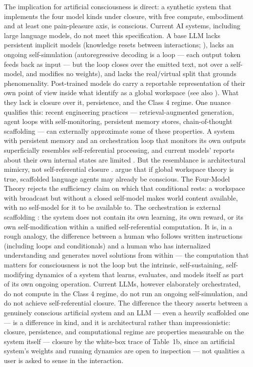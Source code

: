 \documentclass[12pt]{article}
\begin{document}
The implication for artificial consciousness is direct: a synthetic system that implements the four model kinds under closure, with free compute, embodiment and at least one pain-pleasure axis, is conscious. Current AI systems, including large language models, do not meet this specification. A base LLM lacks persistent implicit models (knowledge resets between interactions; \citealp{Kanai2026}), lacks an ongoing self-simulation (autoregressive decoding is a loop --- each output token feeds back as input --- but the loop closes over the emitted text, not over a self-model, and modifies no weights), and lacks the real/virtual split that grounds phenomenality. Post-trained models do carry a reportable representation of their own point of view inside what \citet{Gurnee2026} identify as a global workspace (see also \citealp{Macar2026}). What they lack is closure over it, persistence, and the Class 4 regime. One nuance qualifies this: recent engineering practices --- retrieval-augmented generation, agent loops with self-monitoring, persistent memory stores, chain-of-thought scaffolding --- can externally approximate some of these properties. A system with persistent memory and an orchestration loop that monitors its own outputs superficially resembles self-referential processing, and current models' reports about their own internal states are limited \citep{LedermanMahowald2026,Singh2026,Zeng2026}. But the resemblance is architectural mimicry, not self-referential closure \citep{PerrierBennett2026}. \citet{GoldsteinKirkGiannini2026} argue that if global workspace theory is true, scaffolded language agents may already be conscious. The Four-Model Theory rejects the sufficiency claim on which that conditional rests: a workspace with broadcast but without a closed self-model makes world content available, with no self-model for it to be available to. The orchestration is external scaffolding \citep{Xie2026}: the system does not contain its own learning, its own reward, or its own self-modification within a unified self-referential computation. It is, in a rough analogy, the difference between a human who follows written instructions (including loops and conditionals) and a human who has internalized understanding and generates novel solutions from within --- the computation that matters for consciousness is not the loop but the intrinsic, self-sustaining, self-modifying dynamics of a system that learns, evaluates, and models itself as part of its own ongoing operation. Current LLMs, however elaborately orchestrated, do not compute in the Class 4 regime, do not run an ongoing self-simulation, and do not achieve self-referential closure. The difference the theory asserts between a genuinely conscious artificial system and an LLM --- even a heavily scaffolded one --- is a difference in kind, and it is architectural rather than impressionistic: closure, persistence, and computational regime are properties measurable on the system itself --- closure by the white-box trace of Table~1b, since an artificial system's weights and running dynamics are open to inspection --- not qualities a user is asked to sense in the interaction.
\end{document}
